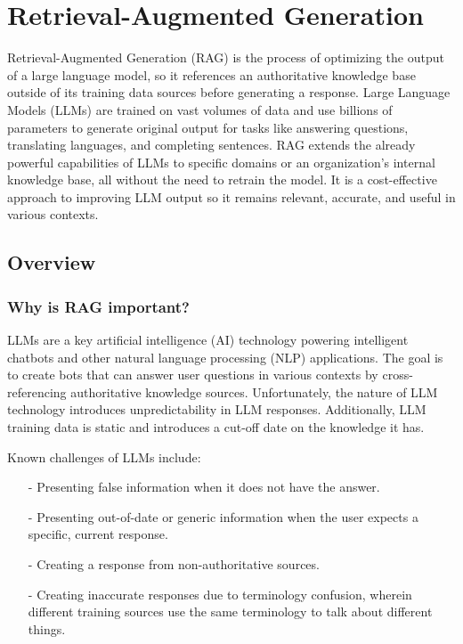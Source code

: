 ﻿\chapter{Retrieval-Augmented Generation}

Retrieval-Augmented Generation (RAG) is the process of optimizing the output of a large language model, 
so it references an authoritative knowledge base outside of its training data sources before generating 
a response. Large Language Models (LLMs) are trained on vast volumes of data and use billions of parameters 
to generate original output for tasks like answering questions, translating languages, and completing 
sentences. RAG extends the already powerful capabilities of LLMs to specific domains or an organization's 
internal knowledge base, all without the need to retrain the model. It is a cost-effective approach 
to improving LLM output so it remains relevant, accurate, and useful in various contexts.

\section{Overview}




\subsection{Why is RAG important?}

LLMs are a key artificial intelligence (AI) technology powering intelligent chatbots and other natural 
language processing (NLP) applications. The goal is to create bots that can answer user questions in 
various contexts by cross-referencing authoritative knowledge sources. Unfortunately, the nature of 
LLM technology introduces unpredictability in LLM responses. Additionally, LLM training data is static 
and introduces a cut-off date on the knowledge it has.

Known challenges of LLMs include:

\begin{itemize}
\setlength{\parskip}{0pt}
\item[-]
Presenting false information when it does not have the answer.

\item[-]
Presenting out-of-date or generic information when the user expects a specific, current response.

\item[-]
Creating a response from non-authoritative sources.

\item[-]
Creating inaccurate responses due to terminology confusion, wherein different training sources use 
the same terminology to talk about different things.
\end{itemize}

